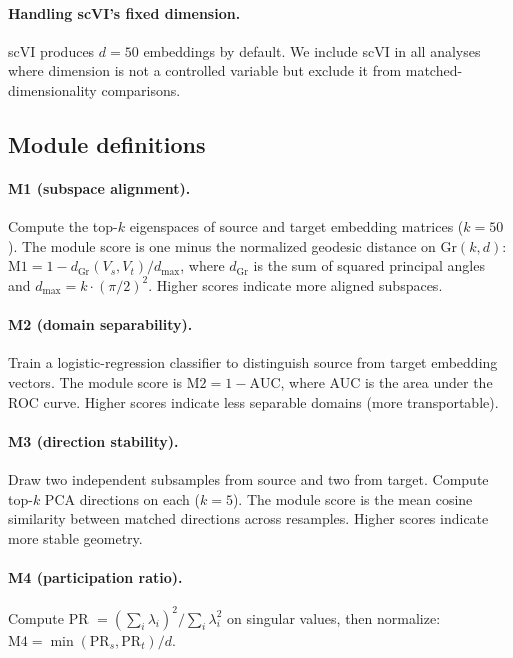 \documentclass[11pt]{article}
\newcommand{\Gr}{\mathrm{Gr}}
\begin{document}
\paragraph{Handling scVI's fixed dimension.} scVI produces $d = 50$ embeddings by default. We include scVI in all analyses where dimension is not a controlled variable but exclude it from matched-dimensionality comparisons.

\subsection{Module definitions}

\paragraph{M1 (subspace alignment).} Compute the top-$k$ eigenspaces of source and target embedding matrices ($k = 50$). The module score is one minus the normalized geodesic distance on $\Gr(k, d)$: $\text{M1} = 1 - d_{\Gr}(V_s, V_t) / d_{\max}$, where $d_{\Gr}$ is the sum of squared principal angles and $d_{\max} = k \cdot (\pi/2)^2$. Higher scores indicate more aligned subspaces.

\paragraph{M2 (domain separability).} Train a logistic-regression classifier to distinguish source from target embedding vectors. The module score is $\text{M2} = 1 - \text{AUC}$, where AUC is the area under the ROC curve. Higher scores indicate less separable domains (more transportable).

\paragraph{M3 (direction stability).} Draw two independent subsamples from source and two from target. Compute top-$k$ PCA directions on each ($k = 5$). The module score is the mean cosine similarity between matched directions across resamples. Higher scores indicate more stable geometry.

\paragraph{M4 (participation ratio).} Compute PR $= (\sum_i \lambda_i)^2 / \sum_i \lambda_i^2$ on singular values, then normalize: $\text{M4} = \min(\text{PR}_s, \text{PR}_t) / d$.
\end{document}
